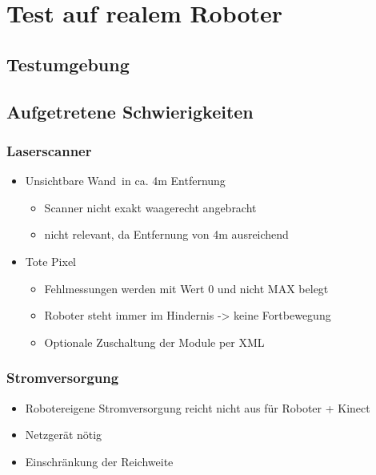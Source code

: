 
\chapter{Test auf realem Roboter}


\section{Testumgebung}


\section{Aufgetretene Schwierigkeiten}

\subsection{Laserscanner}

\begin{itemize}
	\item \glqq Unsichtbare Wand\grqq\ in ca. 4m Entfernung
	\begin{itemize}
		\item Scanner nicht exakt waagerecht angebracht
		\item nicht relevant, da Entfernung von 4m ausreichend
	\end{itemize}
	\item \glqq Tote Pixel\grqq
	\begin{itemize}
		\item Fehlmessungen werden mit Wert 0 und nicht MAX belegt
		\item Roboter steht immer im Hindernis -> keine Fortbewegung
		\item Optionale Zuschaltung der Module per XML
	\end{itemize}
\end{itemize}


\subsection{Stromversorgung}

\begin{itemize}
	\item Robotereigene Stromversorgung reicht nicht aus für Roboter + Kinect
	\item Netzgerät nötig
	\item Einschränkung der Reichweite
\end{itemize}

